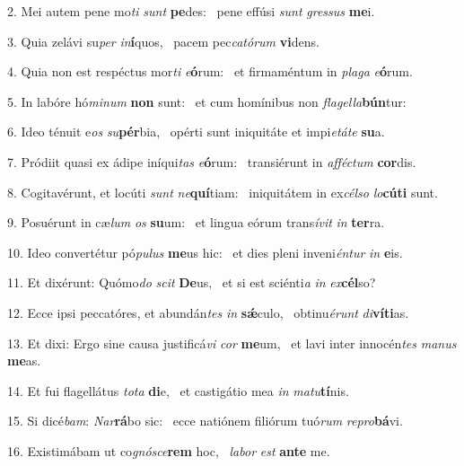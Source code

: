 2. Mei autem pene mo\textit{ti} \textit{sunt} \textbf{pe}des: \ast\  pene effúsi \textit{sunt} \textit{gres}\textit{sus} \textbf{me}i.\

3. Quia zelávi su\textit{per} \textit{in}\textbf{í}quos, \ast\  pacem pec\textit{ca}\textit{tó}\textit{rum} \textbf{vi}dens.\

4. Quia non est respéctus mor\textit{ti} \textit{e}\textbf{ó}rum: \ast\  et firmaméntum in \textit{pla}\textit{ga} \textit{e}\textbf{ó}rum.\

5. In labóre hó\textit{mi}\textit{num} \textbf{non} sunt: \ast\  et cum homínibus non \textit{fla}\textit{gel}\textit{la}\textbf{bún}tur:\

6. Ideo ténuit e\textit{os} \textit{su}\textbf{pér}bia, \ast\  opérti sunt iniquitáte et impi\textit{e}\textit{tá}\textit{te} \textbf{su}a.\

7. Pródiit quasi ex ádipe iníqui\textit{tas} \textit{e}\textbf{ó}rum: \ast\  transiérunt in \textit{af}\textit{féc}\textit{tum} \textbf{cor}dis.\

8. Cogitavérunt, et locúti \textit{sunt} \textit{ne}\textbf{quí}tiam: \ast\  iniquitátem in ex\textit{cél}\textit{so} \textit{lo}\textbf{cú}\textbf{ti} sunt.\

9. Posuérunt in cæ\textit{lum} \textit{os} \textbf{su}um: \ast\  et lingua eórum trans\textit{í}\textit{vit} \textit{in} \textbf{ter}ra.\

10. Ideo convertétur pó\textit{pu}\textit{lus} \textbf{me}us hic: \ast\  et dies pleni inveni\textit{én}\textit{tur} \textit{in} \textbf{e}is.\

11. Et dixérunt: Quómo\textit{do} \textit{scit} \textbf{De}us, \ast\  et si est sciénti\textit{a} \textit{in} \textit{ex}\textbf{cél}so?\

12. Ecce ipsi peccatóres, et abundán\textit{tes} \textit{in} \textbf{sǽ}culo, \ast\  obtinu\textit{é}\textit{runt} \textit{di}\textbf{ví}\textbf{ti}as.\

13. Et dixi: Ergo sine causa justificá\textit{vi} \textit{cor} \textbf{me}um, \ast\  et lavi inter innocén\textit{tes} \textit{ma}\textit{nus} \textbf{me}as.\

14. Et fui flagellátus \textit{to}\textit{ta} \textbf{di}e, \ast\  et castigátio mea \textit{in} \textit{ma}\textit{tu}\textbf{tí}nis.\

15. Si dicé\textit{bam}: \textit{Nar}\textbf{rá}bo sic: \ast\  ecce natiónem filiórum tuó\textit{rum} \textit{re}\textit{pro}\textbf{bá}vi.\

16. Existimábam ut co\textit{gnó}\textit{sce}\textbf{rem} hoc, \ast\  \textit{la}\textit{bor} \textit{est} \textbf{an}\textbf{te} me.\

